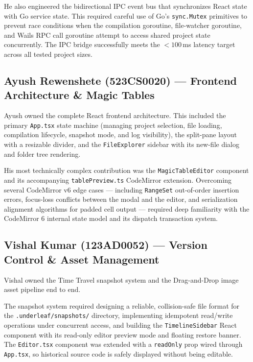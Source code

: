 \documentclass[11pt, a4paper]{article}
\begin{document}
He also engineered the bidirectional IPC event bus that synchronizes React state with Go service state. This required careful use of Go's \texttt{sync.Mutex} primitives to prevent race conditions when the compilation goroutine, file-watcher goroutine, and Wails RPC call goroutine attempt to access shared project state concurrently. The IPC bridge successfully meets the $<100$\,ms latency target across all tested project sizes.

\subsection{Ayush Rewenshete (523CS0020) — Frontend Architecture \& Magic Tables}

Ayush owned the complete React frontend architecture. This included the primary \texttt{App.tsx} state machine (managing project selection, file loading, compilation lifecycle, snapshot mode, and log visibility), the split-pane layout with a resizable divider, and the \texttt{FileExplorer} sidebar with its new-file dialog and folder tree rendering.

His most technically complex contribution was the \texttt{MagicTableEditor} component and its accompanying \texttt{tablePreview.ts} CodeMirror extension. Overcoming several CodeMirror v6 edge cases — including \texttt{RangeSet} out-of-order insertion errors, focus-loss conflicts between the modal and the editor, and serialization alignment algorithms for padded cell output — required deep familiarity with the CodeMirror 6 internal state model and its dispatch transaction system.

\subsection{Vishal Kumar (123AD0052) — Version Control \& Asset Management}

Vishal owned the Time Travel snapshot system and the Drag-and-Drop image asset pipeline end to end.

The snapshot system required designing a reliable, collision-safe file format for the \texttt{.underleaf/snapshots/} directory, implementing idempotent read/write operations under concurrent access, and building the \texttt{TimelineSidebar} React component with its read-only editor preview mode and floating restore banner. The \texttt{Editor.tsx} component was extended with a \texttt{readOnly} prop wired through \texttt{App.tsx}, so historical source code is safely displayed without being editable.
\end{document}
